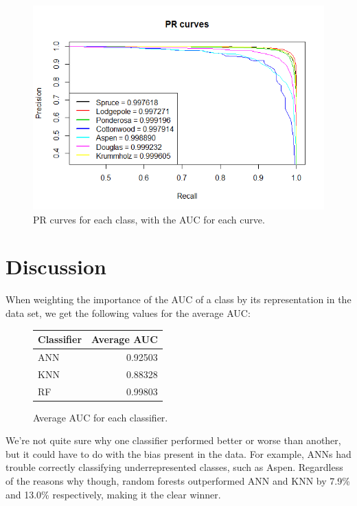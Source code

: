 \documentclass[12pt]{article}
\begin{document}
\begin{figure}[H]
\includegraphics[width=\linewidth]{images/RFPR.png}
\caption{PR curves for each class, with the AUC for each curve.}
\end{figure}


\section{Discussion}
When weighting the importance of the AUC of a class by its representation in the data set, we get the following values for the average AUC:

\begin{figure}[H]
     \begin{center}
     \begin{tabular}{ l | r}
       \hline
       Classifier & Average AUC \\ \hline
     
       ANN & 0.92503 \\ \hline
       KNN & 0.88328 \\ \hline
       RF & 0.99803 \\ \hline
     \end{tabular}
    \end{center}
    \caption{Average AUC for each classifier.}
     \end{figure}
     
We're not quite sure why one classifier performed better or worse than another, but it could have to do with the bias present in the data. For example, ANNs had trouble correctly classifying underrepresented classes, such as Aspen. Regardless of the reasons why though, random forests outperformed ANN and KNN by 7.9\% and 13.0\% respectively, making it the clear winner.
\end{document}
